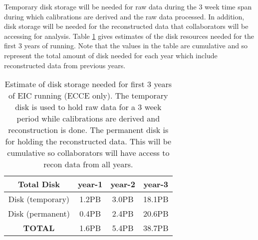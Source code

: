 Temporary disk storage will be needed for raw data during the 3 week time span during which calibrations are derived and the raw data processed. In addition, disk storage will be needed for the reconstructed data that collaborators will be accessing for analysis. Table \ref{tab:disk_summary} gives estimates of the disk resources needed for the first 3 years of running. Note that the values in the table are cumulative and so represent the total amount of disk needed for each year which include reconstructed data from previous years.


\begin{table}[htb!]
    \centering
    \begin{tabular}{c|c|c|c}
        \hline
        \textbf{Total Disk} & year-1 & year-2 & year-3 \\
        \hline
        \hline
        Disk (temporary)  &  1.2PB & 3.0PB & 18.1PB \\
        \hline
        Disk (permanent)    & 0.4PB & 2.4PB &	20.6PB \\
        \hline
        \textbf{TOTAL}          & 1.6PB &	5.4PB &	38.7PB \\
        \hline
    \end{tabular}
    \caption{Estimate of disk storage needed for first 3 years of EIC running (ECCE only). The temporary disk is used to hold raw data for a 3 week period while calibrations are derived and reconstruction is done. The permanent disk is for holding the reconstructed data. This will be cumulative so collaborators will have access to recon data from all years.}
    \label{tab:disk_summary}
\end{table}

